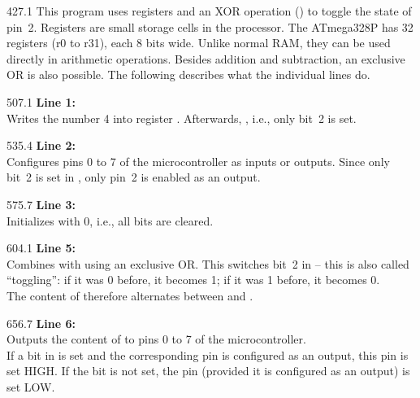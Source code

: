 \documentclass{aslab}
\begin{document}
\begin{region}[pitch=13.17]{427.1}
This program uses registers and an XOR operation () to toggle the
state of pin~2. Registers are small storage cells in the processor. The
ATmega328P has 32 registers (r0 to r31), each 8 bits wide.
Unlike normal RAM, they can be used directly in arithmetic operations.
Besides addition and subtraction, an exclusive OR is also possible. The
following describes what the individual lines do.
\end{region}

\begin{region}[pitch=12.3]{507.1}
\textbf{Line 1:} \\
Writes the number 4 into register . Afterwards,
, i.e., only bit~2 is set.
\end{region}

\begin{region}[pitch=12.2]{535.4}
\textbf{Line 2:} \\
Configures pins 0 to 7 of the microcontroller as inputs or outputs. Since
only bit~2 is set in , only pin~2 is enabled as an output.
\end{region}

\begin{region}[pitch=12.4]{575.7}
\textbf{Line 3:} \\
Initializes  with 0, i.e., all bits are cleared.
\end{region}

\begin{region}[pitch=12.2]{604.1}
\textbf{Line 5:} \\
Combines  with  using an exclusive OR. This switches
bit~2 in  -- this is also called ``toggling'': if it was 0
before, it becomes 1; if it was 1 before, it becomes 0.\\
The content of  therefore alternates between  and
.
\end{region}

\begin{region}[pitch=12.2]{656.7}
\textbf{Line 6:} \\
Outputs the content of  to pins 0 to 7 of the microcontroller.\\
If a bit in  is set and the corresponding pin is configured as an
output, this pin is set HIGH. If the bit is not set, the pin (provided it is
configured as an output) is set LOW.
\end{region}
\end{document}
